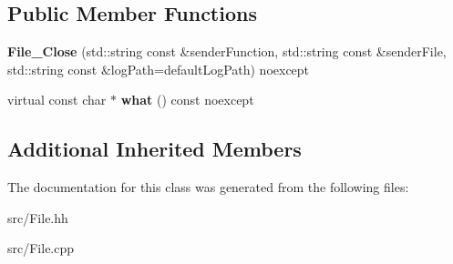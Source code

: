 \subsection*{Public Member Functions}
\begin{DoxyCompactItemize}
\item 
\hypertarget{classstb_1_1File__Close_a3f9582532c5a3f04d1d248c277a177fb}{{\bfseries File\+\_\+\+Close} (std\+::string const \&sender\+Function, std\+::string const \&sender\+File, std\+::string const \&log\+Path=default\+Log\+Path) noexcept}\label{classstb_1_1File__Close_a3f9582532c5a3f04d1d248c277a177fb}

\item 
\hypertarget{classstb_1_1File__Close_a56b489c45a6ca2aedcd32e52a93602d5}{virtual const char $\ast$ {\bfseries what} () const noexcept}\label{classstb_1_1File__Close_a56b489c45a6ca2aedcd32e52a93602d5}

\end{DoxyCompactItemize}
\subsection*{Additional Inherited Members}


The documentation for this class was generated from the following files\+:\begin{DoxyCompactItemize}
\item 
src/File.\+hh\item 
src/File.\+cpp\end{DoxyCompactItemize}
